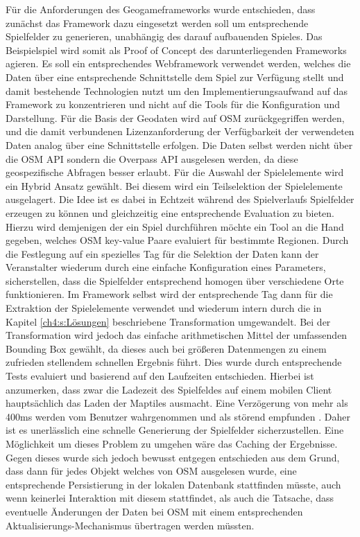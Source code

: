 Für die Anforderungen des Geogameframeworks wurde entschieden, dass zunächst das Framework dazu eingesetzt werden soll um entsprechende  Spielfelder zu generieren, unabhängig des darauf aufbauenden Spieles. Das Beispielspiel wird somit als Proof of Concept des darunterliegenden Frameworks agieren. Es soll ein entsprechendes Webframework verwendet werden, welches die Daten über eine entsprechende Schnittstelle dem Spiel zur Verfügung stellt und damit bestehende Technologien nutzt um den Implementierungsaufwand auf das Framework zu konzentrieren und nicht auf die Tools für die Konfiguration und Darstellung. Für die Basis der Geodaten wird auf OSM zurückgegriffen werden, und die damit verbundenen Lizenzanforderung der Verfügbarkeit der verwendeten Daten analog über eine Schnittstelle erfolgen. Die Daten selbst werden nicht über die OSM API sondern die Overpass API ausgelesen werden, da diese geospezifische Abfragen besser erlaubt.
Für die Auswahl der Spielelemente wird ein Hybrid Ansatz gewählt. Bei diesem wird ein Teilselektion der Spielelemente ausgelagert.
Die Idee ist es dabei in Echtzeit während des Spielverlaufs Spielfelder erzeugen zu können und gleichzeitig eine entsprechende Evaluation zu bieten. Hierzu wird demjenigen der ein Spiel durchführen möchte ein Tool an die Hand gegeben, welches OSM key-value Paare evaluiert für bestimmte Regionen. Durch die Festlegung auf ein spezielles Tag für die Selektion der Daten kann der Veranstalter wiederum durch eine einfache Konfiguration eines Parameters, sicherstellen, dass die Spielfelder entsprechend homogen über verschiedene Orte funktionieren. Im Framework selbst wird der entsprechende Tag dann für die Extraktion der Spielelemente verwendet und wiederum intern durch die in Kapitel \ref{ch4:s:Lösungen} beschriebene Transformation umgewandelt. Bei der Transformation wird jedoch das einfache arithmetischen Mittel der umfassenden Bounding Box gewählt, da dieses auch bei größeren Datenmengen zu einem zufrieden stellendem schnellen Ergebnis führt. Dies wurde durch entsprechende Tests evaluiert und basierend auf den Laufzeiten entschieden. Hierbei ist anzumerken, dass zwar die Ladezeit des Spielfeldes auf einem mobilen Client hauptsächlich das Laden der Maptiles ausmacht. Eine Verzögerung von mehr als 400ms werden vom Benutzer wahrgenommen und als störend empfunden \cite{Gutwin.2004}. Daher ist es unerlässlich eine schnelle Generierung der Spielfelder sicherzustellen.
Eine Möglichkeit um dieses Problem zu umgehen wäre das Caching der Ergebnisse. Gegen dieses wurde sich jedoch bewusst entgegen entschieden aus dem Grund, dass dann für jedes Objekt welches von OSM ausgelesen wurde, eine entsprechende Persistierung in der lokalen Datenbank stattfinden müsste, auch wenn keinerlei Interaktion mit diesem stattfindet, als auch die Tatsache, dass eventuelle Änderungen der Daten bei OSM mit einem entsprechenden Aktualisierungs-Mechanismus übertragen werden müssten.
